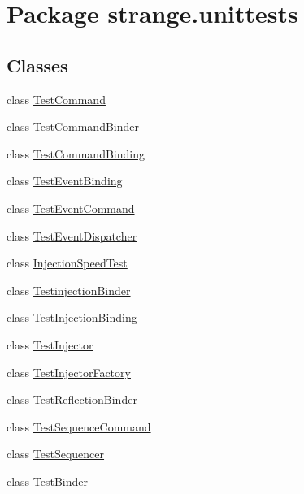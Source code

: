 \hypertarget{namespacestrange_1_1unittests}{\section{Package strange.\-unittests}
\label{namespacestrange_1_1unittests}
}
\subsection*{Classes}
\begin{DoxyCompactItemize}
\item 
class \hyperlink{classstrange_1_1unittests_1_1_test_command}{Test\-Command}
\item 
class \hyperlink{classstrange_1_1unittests_1_1_test_command_binder}{Test\-Command\-Binder}
\item 
class \hyperlink{classstrange_1_1unittests_1_1_test_command_binding}{Test\-Command\-Binding}
\item 
class \hyperlink{classstrange_1_1unittests_1_1_test_event_binding}{Test\-Event\-Binding}
\item 
class \hyperlink{classstrange_1_1unittests_1_1_test_event_command}{Test\-Event\-Command}
\item 
class \hyperlink{classstrange_1_1unittests_1_1_test_event_dispatcher}{Test\-Event\-Dispatcher}
\item 
class \hyperlink{classstrange_1_1unittests_1_1_injection_speed_test}{Injection\-Speed\-Test}
\item 
class \hyperlink{classstrange_1_1unittests_1_1_testinjection_binder}{Testinjection\-Binder}
\item 
class \hyperlink{classstrange_1_1unittests_1_1_test_injection_binding}{Test\-Injection\-Binding}
\item 
class \hyperlink{classstrange_1_1unittests_1_1_test_injector}{Test\-Injector}
\item 
class \hyperlink{classstrange_1_1unittests_1_1_test_injector_factory}{Test\-Injector\-Factory}
\item 
class \hyperlink{classstrange_1_1unittests_1_1_test_reflection_binder}{Test\-Reflection\-Binder}
\item 
class \hyperlink{classstrange_1_1unittests_1_1_test_sequence_command}{Test\-Sequence\-Command}
\item 
class \hyperlink{classstrange_1_1unittests_1_1_test_sequencer}{Test\-Sequencer}
\item 
class \hyperlink{classstrange_1_1unittests_1_1_test_binder}{Test\-Binder}

\end{DoxyCompactItemize}
